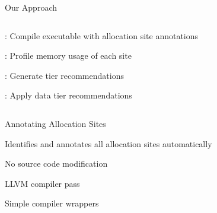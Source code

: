 \documentclass[final,hyperref={pdfpagelabels=false}]{beamer}
\begin{document}
\begin{frame}{Our Approach}
  \begin{columns}[T,onlytextwidth]%
    \begin{customlist}{0em}{0em}
      \item {}: Compile executable with allocation site annotations
      \item {}: Profile memory usage of each site
      \item {}: Generate tier recommendations
      \item {}: Apply data tier recommendations
    \end{customlist}
    \centering
    \resizebox{.9\textwidth}{!}{%
      
    }
  \end{columns}
\end{frame}

\lstset{showspaces=false,showstringspaces=false}%
\begin{frame}{Annotating Allocation Sites}
  \begin{customlist}{0em}{0em}
    \item Identifies and annotates all allocation sites automatically
    \item No source code modification
    \item LLVM compiler pass
    \item Simple compiler wrappers
  \end{customlist}
  \centering
  \vspace{2em}
\end{frame}
\end{document}
